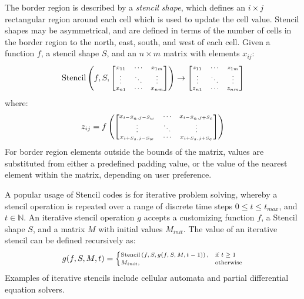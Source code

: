 \documentclass[nonatbib,preprint,nocopyrightspace,9pt]{sigplanconf}
\begin{document}
The border region is described by a \emph{stencil shape}, which defines an $i
\times j$ rectangular region around each cell which is used to update the cell
value. Stencil shapes may be asymmetrical, and are defined in terms of the
number of cells in the border region to the north, east, south, and west of each
cell. Given a function $f$, a stencil shape $S$, and an $n \times m$ matrix with
elements $x_{ij}$:
%
\begin{equation}
\scriptsize
\stencil \left( f, S,
\begin{bmatrix}
  x_{11} & \cdots & x_{1m} \\
  \vdots & \ddots & \vdots \\
  x_{n1} & \cdots & x_{nm}
\end{bmatrix} \right)
\to
\begin{bmatrix}
  z_{11} & \cdots & z_{1m} \\
  \vdots & \ddots & \vdots \\
  z_{n1} & \cdots & z_{nm}
\end{bmatrix}
\end{equation}
%
where:
%
\begin{equation}
\scriptsize
z_{ij} = f \left(
\begin{bmatrix}
  x_{i-S_n,j-S_w} & \cdots & x_{i-S_n,j+S_e} \\
  \vdots & \ddots & \vdots \\
  x_{i+S_s,j-S_w} & \cdots & x_{i+S_s,j+S_e}
\end{bmatrix} \right)
\end{equation}
%
For border region elements outside the bounds of the matrix, values are
substituted from either a predefined padding value, or the value of the nearest
element within the matrix, depending on user preference.

A popular usage of Stencil codes is for iterative problem solving, whereby a
stencil operation is repeated over a range of discrete time steps $0 \le t \le
t_{max}$, and $t \in \mathbb{N}$. An iterative stencil operation $g$ accepts a
customizing function $f$, a Stencil shape $S$, and a matrix $M$ with initial
values $M_{init}$. The value of an iterative stencil can be defined recursively
as:
%
\begin{equation}
\scriptsize
g(f, S, M, t) =
\begin{cases}
  \stencil \left( f, S, g(f, S, M, t-1) \right),& \text{if } t \geq 1\\
  M_{init}, & \text{otherwise}
\end{cases}
\end{equation}
%
Examples of iterative stencils include cellular automata and partial
differential equation solvers.
\end{document}
